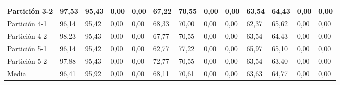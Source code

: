 \documentclass[10pt,a4paper]{article}
\begin{document}
\begin{table}[H]
{\begin{tabular}{|l|l|l|l|l|l|l|l|l|l|l|l|l|}
Partición 3-2                              & 97,53        & 95,43         & 0,00    & 0,00 & 67,22        & 70,55         & 0,00    & 0,00 & 63,54        & 64,43         & 0,00    & 0,00 \\ \hline
Partición 4-1                              & 96,14        & 95,42         & 0,00    & 0,00 & 68,33        & 70,00         & 0,00    & 0,00 & 62,37        & 65,62         & 0,00    & 0,00 \\ \hline
Partición 4-2                              & 98,23        & 95,43         & 0,00    & 0,00 & 67,77        & 70,55         & 0,00    & 0,00 & 63,54        & 64,43         & 0,00    & 0,00 \\ \hline
Partición 5-1                              & 96,14        & 95,42         & 0,00    & 0,00 & 62,77        & 77,22         & 0,00    & 0,00 & 65,97        & 65,10         & 0,00    & 0,00 \\ \hline
Partición 5-2                              & 97,88        & 95,43         & 0,00    & 0,00 & 72,77        & 70,55         & 0,00    & 0,00 & 63,54        & 63,40         & 0,00    & 0,00 \\ \hline
Media                                      & 96,41        & 95,92         & 0,00    & 0,00 & 68,11        & 70,61         & 0,00    & 0,00 & 63,63        & 64,77         & 0,00    & 0,00 \\ \hline
\end{tabular}}
\end{table}
\end{document}
